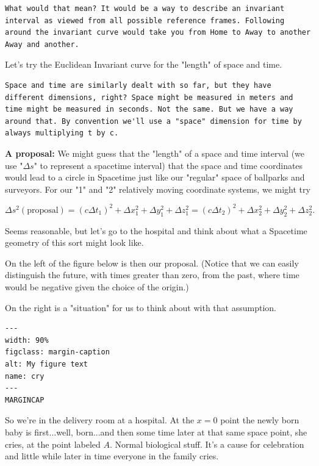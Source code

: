 \documentclass[
]{article}
\begin{document}
\begin{verbatim}
What would that mean? It would be a way to describe an invariant interval as viewed from all possible reference frames. Following around the invariant curve would take you from Home to Away to another Away and another.
\end{verbatim}

Let's try the Euclidean Invariant curve for the "length" of space and
time.

\begin{verbatim}
Space and time are similarly dealt with so far, but they have different dimensions, right? Space might be measured in meters and time might be measured in seconds. Not the same. But we have a way around that. By convention we'll use a "space" dimension for time by always multiplying t by c.
\end{verbatim}

\textbf{A proposal:} We might guess that the "length" of a space and
time interval (we use "\(\Delta s\)" to represent a spacetime interval)
that the space and time coordinates would lead to a circle in Spacetime
just like our "regular" space of ballparks and surveyors. For our "1"
and "2" relatively moving coordinate systems, we might try

\[\Delta s^2 (\text{proposal}) = (c\Delta t_1)^2 + \Delta x_1^2+ \Delta y_1^2 + \Delta z_1^2 = (c\Delta t_2)^2 + \Delta x_2^2+ \Delta y_2^2 + \Delta z_2^2. \nonumber\]

Seems reasonable, but let's go to the hospital and think about what a
Spacetime geometry of this sort might look like.

On the left of the figure below is then our proposal. (Notice that we
can easily distinguish the future, with times greater than zero, from
the past, where time would be negative given the choice of the origin.)

On the right is a "situation" for us to think about with that
assumption.

\begin{verbatim}
---
width: 90%
figclass: margin-caption
alt: My figure text
name: cry
---
MARGINCAP
\end{verbatim}

So we're in the delivery room at a hospital. At the \(x=0\) point the
newly born baby is first...well, born...and then some time later at that
same space point, she cries, at the point labeled \(A\). Normal
biological stuff. It's a cause for celebration and little while later in
time everyone in the family cries.
\end{document}
